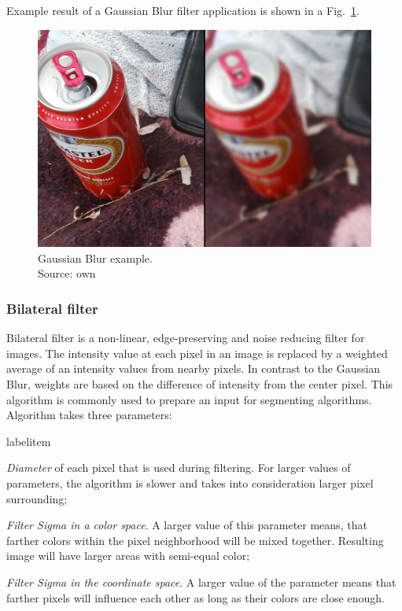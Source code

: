 \documentclass[a4paper,onecolumn,oneside,12pt]{memoir}
\makeatletter
\renewenvironment{itemize}{
  \begin{list}{  
  \csname labelitem\romannumeral\the\@listdepth\endcsname}{
  \setlength{\leftmargin}{1em}
	\setlength{\topsep}{6pt}%
	\setlength{\partopsep}{0pt}%
	\setlength{\parskip}{0pt}%
	\setlength{\parsep}{0pt}%
	\setlength{\itemsep}{0pt}}
}{
  \end{list}
}
\makeatother
\begin{document}
Example result of a Gaussian Blur filter application is shown in a Fig.~\ref{gaussianBlurExample}.

\begin{figure}[!ht]
\begin{center}
\includegraphics[scale=0.1]{images/GaussianBlurExample.jpg}
\caption{Gaussian Blur example. \\
Source: own}
\label{gaussianBlurExample}
\end{center}
\end{figure}

\subsubsection{Bilateral filter}

Bilateral filter \cite{bilateralFilterWiki} is a non-linear, edge-preserving and
noise reducing filter for images. The intensity value at each pixel in an image is replaced by a
weighted average of an intensity values from nearby pixels. In contrast to the Gaussian Blur, 
weights are based on the difference of intensity from the center pixel. This algorithm is commonly
used to prepare an input for segmenting algorithms. Algorithm takes three parameters:

\begin{itemize}
  \item \textit{Diameter} of each pixel that is used during filtering. For larger values of 
        parameters, the algorithm is slower and takes into consideration larger pixel surrounding;
  \item \textit{Filter Sigma in a color space}. A larger value of this parameter means, that farther
        colors within the pixel neighborhood will be mixed together. Resulting image will have
        larger areas with semi-equal color;
  \item \textit{Filter Sigma in the coordinate space}. A larger value of the parameter means that
        farther pixels will influence each other as long as their colors are close enough.
\end{itemize}
\end{document}
